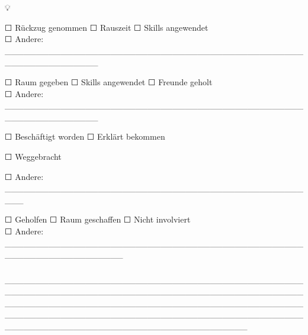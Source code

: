 💡 \textcolor{ctmmGreen}{\textit{\1}}

\textbf{\textcolor{ctmmBlue}{\1}} ☐ Rückzug genommen ☐ Rauszeit ☐ Skills angewendet\\
☐ Andere: \_\_\_\_\_\_\_\_\_\_\_\_\_\_\_\_\_\_\_\_\_\_\_\_\_\_\_\_\_\_\_\_\_\_\_\_\_\_\_\_\_\_\_\_\_\_\_\_\_\_\_\_\_\_\_\_\_\_\_\_\_\_\_

\textbf{\textcolor{ctmmBlue}{\1}} ☐ Raum gegeben ☐ Skills angewendet ☐ Freunde geholt\\
☐ Andere: \_\_\_\_\_\_\_\_\_\_\_\_\_\_\_\_\_\_\_\_\_\_\_\_\_\_\_\_\_\_\_\_\_\_\_\_\_\_\_\_\_\_\_\_\_\_\_\_\_\_\_\_\_\_\_\_\_\_\_\_\_\_\_

\hfill\break
\hfill\break

\textbf{\textcolor{ctmmBlue}{\1}} \textbf{\textcolor{ctmmBlue}{\1}} ☐ Beschäftigt worden ☐ Erklärt bekommen

☐ Weggebracht

☐ Andere: \_\_\_\_\_\_\_\_\_\_\_\_\_\_\_\_\_\_\_\_\_\_\_\_\_\_\_\_\_\_\_\_\_\_\_\_\_\_\_\_\_\_\_\_\_\_\_\_\_\_\_

\hfill\break
\hfill\break

\textbf{\textcolor{ctmmBlue}{\1}}

☐ Geholfen ☐ Raum geschaffen ☐ Nicht involviert\\
☐ Andere: \_\_\_\_\_\_\_\_\_\_\_\_\_\_\_\_\_\_\_\_\_\_\_\_\_\_\_\_\_\_\_\_\_\_\_\_\_\_\_\_\_\_\_\_\_\_\_\_\_\_\_\_\_\_\_\_\_\_\_\_\_\_\_\_\_\_\_

\hfill\break
\hfill\break

\hypertarget{was-hat-sofort-geholfen}{%
\subsubsection[\textbf{\textcolor{ctmmBlue}{\1}}]{\texorpdfstring{\protect\hypertarget{was-hat-sofort-geholfen}{}{}\textbf{\textcolor{ctmmBlue}{\1}}}{Was hat sofort geholfen:}}\label{was-hat-sofort-geholfen}}

\_\_\_\_\_\_\_\_\_\_\_\_\_\_\_\_\_\_\_\_\_\_\_\_\_\_\_\_\_\_\_\_\_\_\_\_\_\_\_\_\_\_\_\_\_\_\_\_\_\_\_\_\_\_\_\_\_\_\_\_\_\_\_\_\_\_\_\_\_\_\_\_\_\_\_\_\_\_\_\_\_\_\_\_\_\_\_\_\_\_\_\_\_\_\_\_\_\_\_\_\_\_\_\_\_\_\_\_\_\_\_\_\_\_\_\_\_\_\_\_\_\_\_\_\_\_\_\_\_\_\_\_\_\_\_\_\_\_\_\_\_\_\_\_\_\_\_\_\_\_\_\_\_\_\_\_\_\_\_\_\_\_\_\_\_\_\_\_\_\_\_\_\_\_\_\_\_\_\_\_\_\_\_\_\_\_\_\_\_\_\_\_\_\_\_\_\_\_\_\_\_\_\_\_\_\_\_\_\_\_\_\_\_\_\_\_\_\_\_\_\_\_\_\_\_\_\_\_\_\_\_

\hypertarget{was-hat-nicht-geholfen}{%
\subsubsection[\textbf{\textcolor{ctmmBlue}{\1}}]{\texorpdfstring{\protect\hypertarget{was-hat-nicht-geholfen}{}{}\textbf{\textcolor{ctmmBlue}{\1}}}{Was hat nicht geholfen:}}\label{was-hat-nicht-geholfen}}

